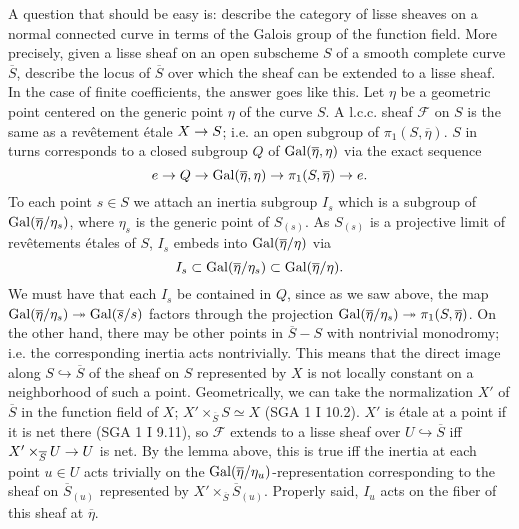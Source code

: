 \documentclass[deligne.tex]{subfiles}
\begin{document}
	A question that should be easy is: describe the category of lisse sheaves
	on a normal connected curve in terms of the Galois group of the function
	field. More precisely, given a lisse sheaf on an open subscheme $S$
	of a smooth complete curve $\overline S$, describe the locus of
	$\overline S$ over which the sheaf can be extended to a lisse sheaf.
	In the case of finite coefficients, the answer goes like this.
	Let $\eta$ be a geometric point centered on the generic point $\eta$
	of the curve $S$. A l.c.c. sheaf $\mathscr F$ on $S$ is the same as a
	revêtement étale $X\rightarrow S$; i.e. an open subgroup of
	$\pi_1(S,\overline\eta)$.
	$S$ in turns corresponds to a closed subgroup $Q$ of
	$\operatorname{Gal}(\overline\eta,\eta)$ via the exact sequence
	\begin{equation*}
		e\rightarrow Q\rightarrow\operatorname{Gal}(\overline\eta,\eta)\rightarrow\pi_1(S,\overline\eta)\rightarrow e.
	\end{equation*}
	To each point $s\in S$ we attach an inertia subgroup $I_s$ which is a
	subgroup of $\operatorname{Gal}(\overline\eta/\eta_s)$, where $\eta_s$ is the generic
	point of $S_{(s)}$. As $S_{(s)}$ is a projective limit of revêtements
	étales of $S$, $I_s$ embeds into
	$\operatorname{Gal}(\overline\eta/\eta)$ via
	\begin{equation*}
		I_s\subset\operatorname{Gal}(\overline\eta/\eta_s)\subset\operatorname{Gal}(\overline\eta/\eta).
	\end{equation*}
	We must have that each $I_s$ be contained in $Q$, since as we saw above,
	the map $\operatorname{Gal}(\overline\eta/\eta_s)\twoheadrightarrow\operatorname{Gal}(\overline s/s)$
	factors through the projection
	$\operatorname{Gal}(\overline\eta/\eta_s)\twoheadrightarrow\pi_1(S,\overline\eta)$.
	On the other hand, there may be other points in $\overline S-S$ with
	nontrivial monodromy; i.e. the corresponding inertia acts nontrivially.
	This means that the direct image along $S\hookrightarrow\overline S$ of
	the sheaf on $S$ represented by $X$ is not locally constant on a
	neighborhood of such a point.
	Geometrically, we can take the normalization $X'$ of $\overline S$ in the
	function field of $X$; $X'\times_{\overline S}S\simeq X$ (SGA 1 I 10.2).
	$X'$ is étale at a point if it is net there (SGA 1 I 9.11), so
	$\mathscr F$ extends to a lisse sheaf over $U\hookrightarrow\overline S$
	iff $X'\times_{\overline S}U\rightarrow U$ is net.
	By the lemma above, this is true iff the inertia at each point $u\in U$
	acts trivially on the $\operatorname{Gal}(\overline\eta/\eta_u)$-representation
	corresponding to the sheaf on $\overline S_{(u)}$ represented by
	$X'\times_{\overline S}\overline S_{(u)}$.
	Properly said, $I_u$ acts on the fiber of this sheaf at $\overline\eta$.
\end{document}
